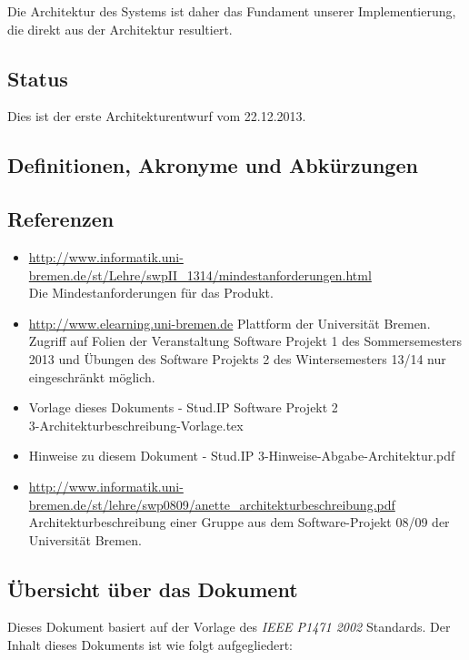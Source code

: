 \documentclass[fontsize=12pt,paper=a4,twoside]{scrartcl}
\begin{document}
Die Architektur des Systems ist daher das Fundament unserer Implementierung, die direkt aus der Architektur resultiert.


\subsection{Status}

Dies ist der erste Architekturentwurf vom 22.12.2013.
\subsection{Definitionen, Akronyme und Abkürzungen}

\subsection{Referenzen}

\begin{itemize}
	\item{\url{http://www.informatik.uni-bremen.de/st/Lehre/swpII_1314/mindestanforderungen.html}\\
	Die Mindestanforderungen für das Produkt.}
	\item{\url{http://www.elearning.uni-bremen.de} Plattform der Universität Bremen. Zugriff auf Folien der Veranstaltung Software Projekt 1 des Sommersemesters 2013 und Übungen des Software Projekts 2 des Wintersemesters 13/14 nur eingeschränkt möglich.} 
	\item{Vorlage dieses Dokuments - Stud.IP Software Projekt 2\\
	 3-Architekturbeschreibung-Vorlage.tex} 
	\item{Hinweise zu diesem Dokument - Stud.IP 3-Hinweise-Abgabe-Architektur.pdf} 
	\item{\url{http://www.informatik.uni-bremen.de/st/lehre/swp0809/anette_architekturbeschreibung.pdf}} Architekturbeschreibung einer Gruppe aus dem Software-Projekt 08/09 der Universität Bremen.
\end{itemize}
\subsection{Übersicht über das Dokument}

Dieses Dokument basiert auf der Vorlage des \textit{IEEE P1471 2002} Standards. Der Inhalt dieses Dokuments ist wie folgt aufgegliedert:
\end{document}
